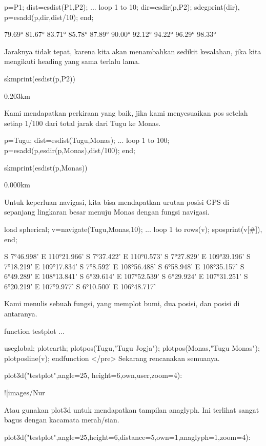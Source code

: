 \documentclass{article}
\begin{document}
\>p=P1;  dist=esdist(P1,P2); ...  
\>     loop 1 to 10; dir=esdir(p,P2); sdegprint(dir), p=esadd(p,dir,dist/10); end;


         79.69°
         81.67°
         83.71°
         85.78°
         87.89°
         90.00°
         92.12°
         94.22°
         96.29°
         98.33°

Jaraknya tidak tepat, karena kita akan menambahkan sedikit kesalahan,
jika kita mengikuti heading yang sama terlalu lama.


\>skmprint(esdist(p,P2))


         0.203km

Kami mendapatkan perkiraan yang baik, jika kami menyesuaikan pos
setelah setiap 1/100 dari total jarak dari Tugu ke Monas.


\>p=Tugu; dist=esdist(Tugu,Monas); ...  
\>     loop 1 to 100; p=esadd(p,esdir(p,Monas),dist/100); end;

\>skmprint(esdist(p,Monas))


         0.000km

Untuk keperluan navigasi, kita bisa mendapatkan urutan posisi GPS di
sepanjang lingkaran besar menuju Monas dengan fungsi navigasi.


\>load spherical; v=navigate(Tugu,Monas,10); ...  
\>     loop 1 to rows(v); sposprint(v[#]), end;


    S 7°46.998' E 110°21.966'
    S 7°37.422' E 110°0.573'
    S 7°27.829' E 109°39.196'
    S 7°18.219' E 109°17.834'
    S 7°8.592' E 108°56.488'
    S 6°58.948' E 108°35.157'
    S 6°49.289' E 108°13.841'
    S 6°39.614' E 107°52.539'
    S 6°29.924' E 107°31.251'
    S 6°20.219' E 107°9.977'
    S 6°10.500' E 106°48.717'

Kami menulis sebuah fungsi, yang memplot bumi, dua posisi, dan posisi
di antaranya.


\>function testplot ...


    useglobal;
    plotearth;
    plotpos(Tugu,"Tugu Jogja"); plotpos(Monas,"Tugu Monas");
    plotposline(v);
    endfunction
</pre>
Sekarang rencanakan semuanya.


\>plot3d("testplot",angle=25, height=6,\>own,\>user,zoom=4):


![images/Nur%

Atau gunakan plot3d untuk mendapatkan tampilan anaglyph. Ini terlihat
sangat bagus dengan kacamata merah/sian.


\>plot3d("testplot",angle=25,height=6,distance=5,own=1,anaglyph=1,zoom=4):
\end{document}
